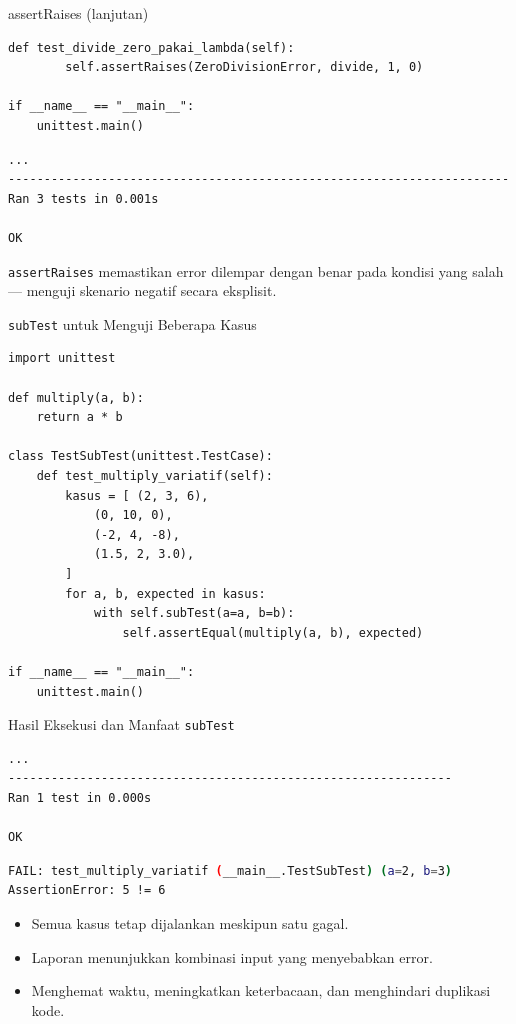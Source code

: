 \documentclass[aspectratio=169, table]{beamer}
\begin{document}
\begin{frame}[fragile]{assertRaises (lanjutan)}
\vspace*{20pt}
\begin{lstlisting}[style=PythonStyle]
    def test_divide_zero_pakai_lambda(self):
        self.assertRaises(ZeroDivisionError, divide, 1, 0)

if __name__ == "__main__":
    unittest.main()
\end{lstlisting}

\begin{lstlisting}[language=bash]
...
----------------------------------------------------------------------
Ran 3 tests in 0.001s

OK
\end{lstlisting}

\texttt{assertRaises} memastikan error dilempar dengan benar 
pada kondisi yang salah — menguji skenario negatif secara eksplisit.
\end{frame}

\begin{frame}[fragile]{\texttt{subTest} untuk Menguji Beberapa Kasus}
\vspace*{20pt}
\begin{lstlisting}[style=PythonStyle]
import unittest

def multiply(a, b):
    return a * b

class TestSubTest(unittest.TestCase):
    def test_multiply_variatif(self):
        kasus = [ (2, 3, 6),
            (0, 10, 0),
            (-2, 4, -8),
            (1.5, 2, 3.0),
        ]
        for a, b, expected in kasus:
            with self.subTest(a=a, b=b):
                self.assertEqual(multiply(a, b), expected)

if __name__ == "__main__":
    unittest.main()
\end{lstlisting}
\end{frame}

\begin{frame}[fragile]{Hasil Eksekusi dan Manfaat \texttt{subTest}}
\vspace*{20pt}
\begin{lstlisting}[language=bash]
...
--------------------------------------------------------------
Ran 1 test in 0.000s

OK
\end{lstlisting}

\begin{lstlisting}[language=bash]
FAIL: test_multiply_variatif (__main__.TestSubTest) (a=2, b=3)
AssertionError: 5 != 6
\end{lstlisting}

\begin{itemize}
  \item Semua kasus tetap dijalankan meskipun satu gagal.
  \item Laporan menunjukkan kombinasi input yang menyebabkan error.
  \item Menghemat waktu, meningkatkan keterbacaan, 
        dan menghindari duplikasi kode.
\end{itemize}
\end{frame}
\end{document}
